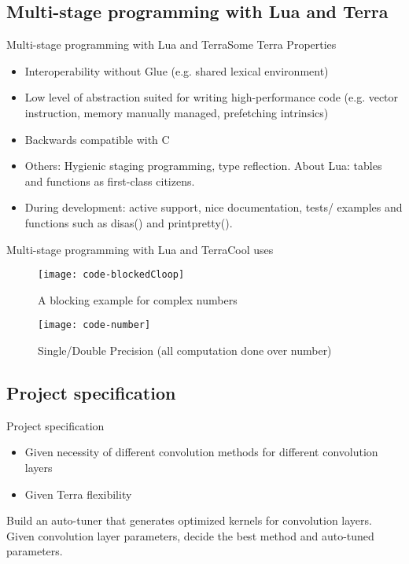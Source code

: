 \subsection{Multi-stage programming with Lua and Terra}

\begin{frame}{Multi-stage programming with Lua and Terra}{Some Terra Properties}
  \begin{itemize}
  
  \item {
    Interoperability without Glue (e.g. shared lexical environment)
  }
    
   \item {   
    Low level of abstraction suited
for writing high-performance code (e.g. vector instruction, memory manually managed, prefetching intrinsics)
  }

  \item {   
    Backwards compatible with C
  }

  \item {   
    Others: Hygienic staging programming, type reflection. About Lua: tables and functions as first-class citizens. 
  }
 
  \item {   
    During development: active support, nice documentation, tests/ examples and functions such as disas() and printpretty().
  }
  \end{itemize}
\end{frame}

\begin{frame}{Multi-stage programming with Lua and Terra}{Cool uses}
 \begin{figure}[ht] \label{fig1} 
\texttt{[image: code-blockedCloop]}
 \caption{A blocking example for complex numbers} 
\texttt{[image: code-number]}
 \caption{Single/Double Precision (all computation done over number)} 
\end{figure}
\end{frame}

\subsection{Project specification}

\begin{frame}{Project specification}
\begin{itemize}
  \item {
    Given necessity of different convolution methods for different convolution layers
  }
   \item {   
    Given Terra flexibility
  }
\end{itemize}

\begin{block}{}
 Build an auto-tuner that generates optimized kernels for convolution layers. Given convolution layer parameters, decide the best method and auto-tuned parameters.
\end{block}

\end{frame}

